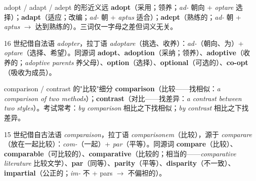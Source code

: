 \documentclass[../main.tex]{subfiles}
\begin{document}

\begin{gram}{adopt / adapt / adept 的形近义远}
\textbf{adopt}（采用；领养；\textit{ad-} 朝向 + \textit{optare} 选择）；\textbf{adapt}（适应；改编；\textit{ad-} 朝 + \textit{aptus} 适合）；\textbf{adept}（熟练的；\textit{ad-} 朝 + \textit{aptus} $\to$ 达到熟练的）。三词仅一字母之差但词义无关。
\end{gram}

\begin{origin}
16 世纪借自法语 \textit{adopter}，拉丁语 \textit{adoptare}（挑选、收养）：\textit{ad-}（朝向、为）+ \textit{optare}（选择、希望）。同源词 \textbf{adopt}、\textbf{adoption}（采纳；领养）、\textbf{adoptive}（收养的；\textit{adoptive parents} 养父母）、\textbf{option}（选择）、\textbf{optional}（可选的）、\textbf{co-opt}（吸收为成员）。
\end{origin}



\begin{gram}{comparison / contrast 的"比较"细分}
\textbf{comparison}（比较——找相似：\textit{a comparison of two methods}）；\textbf{contrast}（对比——找差异：\textit{a contrast between two styles}）。考试常考：\textit{by comparison} 相比之下找相似；\textit{by contrast} 相比之下找差异。
\end{gram}

\begin{origin}
15 世纪借自古法语 \textit{comparaison}，拉丁语 \textit{comparisonem}（比较），源于 \textit{comparare}（放在一起比较）：\textit{com-}（一起）+ \textit{par}（平等）。同源词 \textbf{compare}（比较）、\textbf{comparable}（可比较的）、\textbf{comparative}（比较的；相当的——\textit{comparative literature} 比较文学）、\textbf{par}（同等）、\textbf{parity}（平等）、\textbf{disparity}（不一致）、\textbf{impartial}（公正的；\textit{im-} 不 + pars $\to$ 不偏袒的）。
\end{origin}

\end{document}
